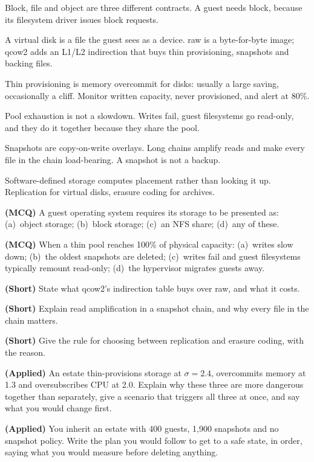 \begin{chaptersummary}
\begin{tight}
  \item Block, file and object are three different contracts. A guest needs
        block, because its filesystem driver issues block requests.
  \item A virtual disk is a file the guest sees as a device. raw is a
        byte-for-byte image; qcow2 adds an L1/L2 indirection that buys thin
        provisioning, snapshots and backing files.
  \item Thin provisioning is memory overcommit for disks: usually a large
        saving, occasionally a cliff. Monitor written capacity, never
        provisioned, and alert at 80\%.
  \item Pool exhaustion is not a slowdown. Writes fail, guest filesystems go
        read-only, and they do it together because they share the pool.
  \item Snapshots are copy-on-write overlays. Long chains amplify reads and
        make every file in the chain load-bearing. A snapshot is not a backup.
  \item Software-defined storage computes placement rather than looking it up.
        Replication for virtual disks, erasure coding for archives.
\end{tight}
\end{chaptersummary}

\begin{reviewq}
  \item \textbf{(MCQ)} A guest operating system requires its storage to be
        presented as: (a)~object storage; (b)~block storage; (c)~an NFS share;
        (d)~any of these.
  \item \textbf{(MCQ)} When a thin pool reaches 100\% of physical capacity:
        (a)~writes slow down; (b)~the oldest snapshots are deleted; (c)~writes
        fail and guest filesystems typically remount read-only; (d)~the
        hypervisor migrates guests away.
  \item \textbf{(Short)} State what qcow2's indirection table buys over raw,
        and what it costs.
  \item \textbf{(Short)} Explain read amplification in a snapshot chain, and
        why every file in the chain matters.
  \item \textbf{(Short)} Give the rule for choosing between replication and
        erasure coding, with the reason.
  \item \textbf{(Applied)} An estate thin-provisions storage at
        $\sigma = 2.4$, overcommits memory at 1.3 and oversubscribes CPU at
        2.0. Explain why these three are more dangerous together than
        separately, give a scenario that triggers all three at once, and say
        what you would change first.
  \item \textbf{(Applied)} You inherit an estate with 400 guests, 1{,}900
        snapshots and no snapshot policy. Write the plan you would follow to
        get to a safe state, in order, saying what you would measure before
        deleting anything.
\end{reviewq}
